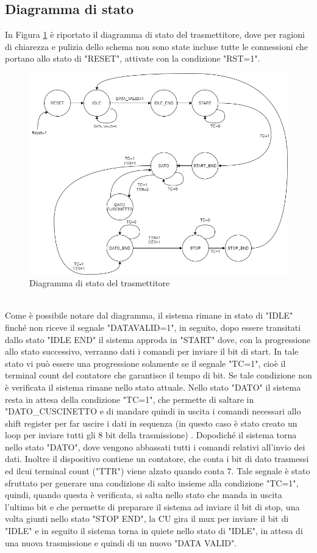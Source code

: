 \documentclass[a4paper, titlepage]{article}
\begin{document}
\subsection{Diagramma di stato}
In Figura \ref{fig:palloTX} è riportato il diagramma di stato del trasmettitore, dove per ragioni di chiarezza e pulizia dello schema non sono state incluse tutte le connessioni che portano allo stato di "RESET", attivate con la condizione "RST=1".\\
\begin{figure}[h]
    \centering
    \includegraphics[scale=0.6]{PalleogrammaTx_V2 (2).png}
    \caption{Diagramma di stato del trasmettitore}
    \label{fig:palloTX}
\end{figure}\\
Come è possibile notare dal diagramma, il sistema rimane in stato di "IDLE" finché non riceve il segnale "DATA\textunderscore VALID=1", in seguito, dopo essere transitati dallo stato "IDLE \textunderscore END" il sistema approda in "START" dove, con la progressione allo stato successivo, verranno dati i comandi per inviare il bit di start. In tale stato vi può essere una progressione solamente se il segnale "TC=1", cioè il terminal count del contatore che garantisce il tempo di bit. Se tale condizione non è verificata il sistema rimane nello stato attuale. Nello stato "DATO" il sistema resta in attesa della condizione "TC=1", che permette di saltare in "DATO\_CUSCINETTO e di mandare quindi in uscita i comandi necessari allo shift register per far uscire i dati in sequenza (in questo caso è stato creato un loop per inviare tutti gli 8 bit della trasmissione) . Dopodiché il sistema  torna nello stato "DATO", dove vengono abbassati tutti i comandi relativi all'invio dei dati. Inoltre il dispositivo contiene un contatore, che conta i bit di dato trasmessi ed ilcui terminal count ("TTR") viene alzato quando conta 7. Tale segnale è stato sfruttato per generare una condizione di salto insieme alla condizione "TC=1", quindi, quando questa è verificata, si salta nello stato che manda in uscita l'ultimo bit e che permette di preparare il sistema ad inviare il bit di stop, una volta giunti nello stato "STOP \textunderscore END", la CU gira il mux per inviare il bit di "IDLE" e in seguito il sistema torna in quiete nello stato di "IDLE", in attesa di una nuova trasmissione e quindi di un nuovo "DATA \textunderscore VALID".
\end{document}
